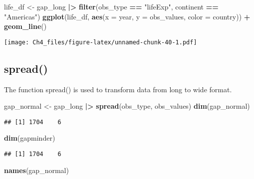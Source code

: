 \documentclass[
]{article}
\newenvironment{Shaded}{\begin{snugshade}}{\end{snugshade}}
\newcommand{\AttributeTok}[1]{\textcolor[rgb]{0.13,0.29,0.53}{#1}}
\newcommand{\FunctionTok}[1]{\textcolor[rgb]{0.13,0.29,0.53}{\textbf{#1}}}
\newcommand{\NormalTok}[1]{#1}
\newcommand{\OtherTok}[1]{\textcolor[rgb]{0.56,0.35,0.01}{#1}}
\newcommand{\SpecialCharTok}[1]{\textcolor[rgb]{0.81,0.36,0.00}{\textbf{#1}}}
\newcommand{\StringTok}[1]{\textcolor[rgb]{0.31,0.60,0.02}{#1}}
\begin{document}
\begin{Shaded}
\begin{Highlighting}[]
\NormalTok{life\_df }\OtherTok{\textless{}{-}}\NormalTok{ gap\_long }\SpecialCharTok{|\textgreater{}}
  \FunctionTok{filter}\NormalTok{(obs\_type }\SpecialCharTok{==} \StringTok{"lifeExp"}\NormalTok{,}
\NormalTok{         continent }\SpecialCharTok{==} \StringTok{"Americas"}\NormalTok{)}
\FunctionTok{ggplot}\NormalTok{(life\_df, }\FunctionTok{aes}\NormalTok{(}\AttributeTok{x =}\NormalTok{ year, }\AttributeTok{y =}\NormalTok{ obs\_values, }\AttributeTok{color =}\NormalTok{ country)) }\SpecialCharTok{+}
  \FunctionTok{geom\_line}\NormalTok{()}
\end{Highlighting}
\end{Shaded}

\texttt{[image: Ch4\_files/figure-latex/unnamed-chunk-40-1.pdf]}

\subsection{spread()}\label{spread}

The function spread() is used to transform data from long to wide
format.

\begin{Shaded}
\begin{Highlighting}[]
\NormalTok{gap\_normal }\OtherTok{\textless{}{-}}\NormalTok{ gap\_long }\SpecialCharTok{|\textgreater{}}
  \FunctionTok{spread}\NormalTok{(obs\_type, obs\_values)}
\FunctionTok{dim}\NormalTok{(gap\_normal)}
\end{Highlighting}
\end{Shaded}

\begin{verbatim}
## [1] 1704    6
\end{verbatim}

\begin{Shaded}
\begin{Highlighting}[]
\FunctionTok{dim}\NormalTok{(gapminder)}
\end{Highlighting}
\end{Shaded}

\begin{verbatim}
## [1] 1704    6
\end{verbatim}

\begin{Shaded}
\begin{Highlighting}[]
\FunctionTok{names}\NormalTok{(gap\_normal)}
\end{Highlighting}
\end{Shaded}
\end{document}
